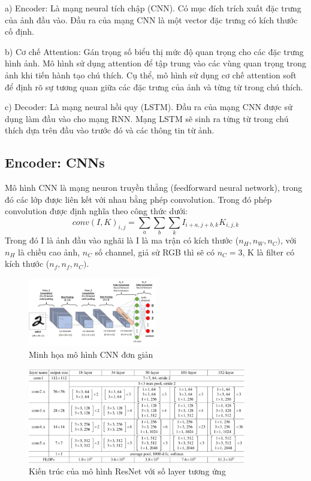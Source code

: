 \documentclass[conference]{IEEEtran}
\begin{document}
a) Encoder: Là mạng neural tích chập (CNN). Có mục đích trích xuất đặc trưng của ảnh đầu vào. Đầu ra của mạng CNN là một vector đặc trưng có kích thước cố định.

b) Cơ chế Attention: Gán trọng số biểu thị mức độ quan trọng cho các đặc trưng hình ảnh. Mô hình sử dụng attention để tập trung vào các vùng quan trọng trong ảnh khi tiến hành tạo chú thích. Cụ thể, mô hình sử dụng cơ chế attention soft để định rõ sự tương quan giữa các đặc trưng của ảnh và từng từ trong chú thích.

c) Decoder: Là mạng neural hồi quy (LSTM). Đầu ra của mạng CNN được sử dụng làm đầu vào cho mạng RNN. Mạng LSTM sẽ sinh ra từng từ trong chú thích dựa trên đầu vào trước đó và các thông tin từ ảnh. 


\subsection{Encoder: CNNs}
Mô hình CNN là mạng neuron truyền thẳng (feedforward neural network), trong đó các lớp được liên kết với nhau bằng phép convolution. Trong đó phép convolution được định nghĩa theo công thức dưới:
$$conv(I,K)_{i,j}=\sum_{a}\sum_{b}\sum_{k}I_{i+a,j+b,k}K_{i,j,k}$$
Trong đó I là ảnh đầu vào nghãi là I là ma trận có kích thước ($n_{H},n_{W},n_{C})$, với $n_{H}$ là chiều cao ảnh, $n_{C}$ số channel, giả sử RGB thì sẽ có $n_{C}=3$, K là filter có kích thước ($n_{f},n_{f},n_{C})$.

\begin{figure}[h]
\includegraphics[width=0.5\textwidth]{assets/simpleCNN.jpeg}
  \caption{Minh họa mô hình CNN đơn giản}
  \label{fig:CNN_architecture}
\end{figure}

\begin{figure}[t]
\centering
\includegraphics[width=0.85\textwidth]{assets/resnet.png}
  \caption{Kiến trúc của mô hình ResNet với số layer tương ứng }
  \label{fig:resnet_architecture}
\end{figure}
\end{document}
